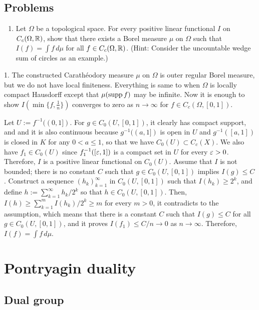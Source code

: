 \documentclass{../../large}
\begin{document}
\section*{Problems}
\begin{enumerate}
\item Let $\Omega$ be a topological space. For every positive linear functional $I$ on $C_c(\Omega,\mathbb{R})$, show that there exists a Borel measure $\mu$ on $\Omega$ such that $I(f)=\int f\,d\mu$ for all $f\in C_c(\Omega,\mathbb{R})$. (Hint: Consider the uncountable wedge sum of circles as an example.)
\end{enumerate}
\begin{sol}
1.
The constructed Carath\'eodory measure $\mu$ on $\Omega$ is outer regular Borel measure, but we do not have local finiteness.
Everything is same to when $\Omega$ is locally compact Hausdorff except that $\mu(\operatorname{supp} f)$ may be infinite.
Now it is enough to show $I(\min\{f,\frac1n\})$ converges to zero as $n\to\infty$ for $f\in C_c(\Omega,[0,1])$.

Let $U:=f^{-1}((0,1])$.
For $g\in C_0(U,[0,1])$, it clearly has compact support, and and it is also continuous because $g^{-1}((a,1])$ is open in $U$ and $g^{-1}([a,1])$ is closed in $K$ for any $0<a\le1$, so that we have $C_0(U)\subset C_c(X)$.
We also have $f_1\in C_0(U)$ since $f_1^{-1}([\varepsilon,1])$ is a compact set in $U$ for every $\varepsilon>0$.
Therefore, $I$ is a positive linear functional on $C_0(U)$.
Assume that $I$ is not bounded; there is no constant $C$ such that $g\in C_0(U,[0,1])$ implies $I(g)\le C$.
Construct a sequence $(h_k)_{k=1}^\infty$ in $C_0(U,[0,1])$ such that $I(h_k)\ge2^k$, and define $h:=\sum_{k=1}^\infty h_k/2^k$ so that $h\in C_0(U,[0,1])$.
Then, $I(h)\ge \sum_{k=1}^mI(h_k)/2^k\ge m$ for every $m>0$, it contradicts to the assumption, which means that there is a constant $C$ such that $I(g)\le C$ for all $g\in C_0(U,[0,1])$, and it proves $I(f_1)\le C/n\to0$ as $n\to\infty$.
Therefore, $I(f)=\int f\,d\mu$.
\end{sol}


\chapter{Pontryagin duality}
\section{Dual group}
\section{}
\end{document}
